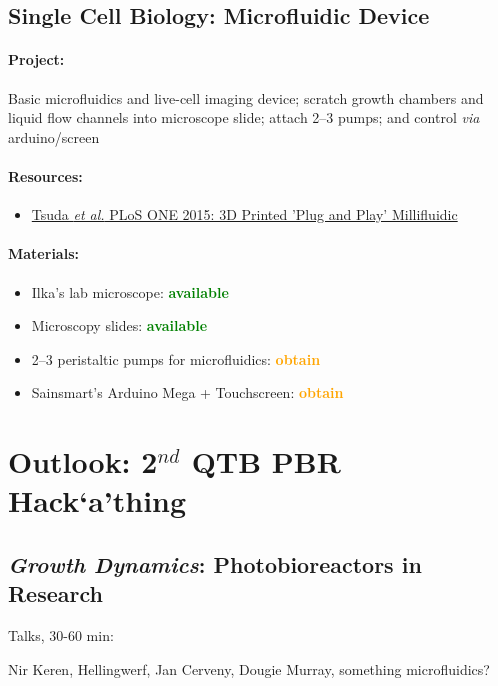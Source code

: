\documentclass[12pt,a4paper]{scrartcl}
\newcommand{\obtain}[0]{\textcolor{orange}{\textbf{obtain}}}
\newcommand{\avail}[0]{\textcolor{green}{\textbf{available}}}
\newcommand{\hack}[0]{Hack`a'thing}
\begin{document}
\newpage
\subsection{Single Cell Biology: Microfluidic Device} 
\label{micro}

\paragraph{Project:} Basic microfluidics and live-cell imaging device;
scratch growth chambers and liquid flow channels into microscope slide;
attach 2--3 pumps; and control \textit{via} arduino/screen

\paragraph{Resources:}
\begin{itemize}
\item \href{http://www.ncbi.nlm.nih.gov/pmc/articles/PMC4641590/}{Tsuda \textit{et al.} PLoS ONE 2015: 3D Printed 'Plug and Play' Millifluidic}
\end{itemize}

\paragraph{Materials:}
\begin{itemize}
\item Ilka's lab microscope: \avail{}
\item Microscopy slides: \avail{}
\item 2--3 peristaltic pumps for microfluidics: \obtain{}
\item Sainsmart's Arduino Mega + Touchscreen: \obtain{}
\end{itemize}


\newpage


\section{Outlook: 2$^{nd}$ QTB PBR \hack{}}

\subsection{\textit{Growth Dynamics}: Photobioreactors in Research}

Talks, 30-60 min:

Nir Keren, Hellingwerf, Jan Cerveny, Dougie Murray,
something microfluidics?
\end{document}
